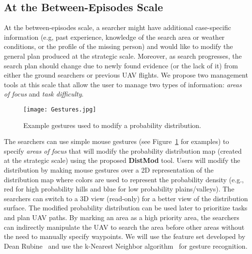 
\subsection{At the Between-Episodes Scale}

At the between-episodes scale, a searcher might have additional case-specific information (e.g, past experience, knowledge of the search area or weather conditions, or the profile of the missing person) and would like to modify the general plan produced at the strategic scale. Moreover, as search progresses, the search plan should change due to newly found evidence (or the lack of it) from either the ground searchers or previous UAV flights. We propose two management tools at this scale that allow the user to manage two types of information: \textit{areas of focus} and \textit{task difficulty}.

\begin{figure}
\centering
\texttt{[image: Gestures.jpg]}
\caption{Example gestures used to modify a probability distribution.}
\label{Gestures}
\end{figure}

The searchers can use simple mouse gestures (see Figure~\ref{Gestures} for examples) to specify \textit{areas of focus} that will modify the probability distribution map (created at the strategic scale) using the proposed \textbf{DistMod} tool. Users will modify the distribution by making mouse gestures over a 2D representation of the distribution map where colors are used to represent the probability density (e.g., red for high probability hills and blue for low probability plains/valleys). The searchers can switch to a 3D view (read-only) for a better view of the distribution surface. The modified probability distribution can be used later to prioritize tasks and plan UAV paths. By marking an area as a high priority area, the searchers can indirectly manipulate the UAV to search the area before other areas without the need to manually specify waypoints. We will use the feature set developed by Dean Rubine~\cite{Rubine1991Specifying} and use the k-Nearest Neighbor algorithm~\cite{Mitchell1997Machine} for gesture recognition.

